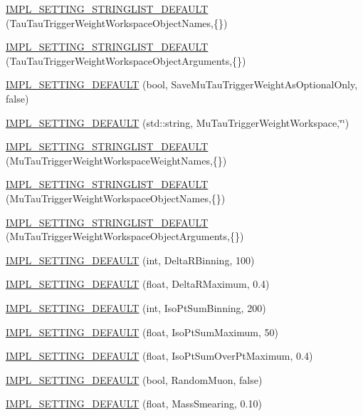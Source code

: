 \begin{DoxyCompactItemize}
\item 
\hyperlink{classHttSettings_a804fffc1952f3be2d23de35fca145662}{IMPL\_\-SETTING\_\-STRINGLIST\_\-DEFAULT} (TauTauTriggerWeightWorkspaceObjectNames,\{\})
\item 
\hyperlink{classHttSettings_a321760ee7322f44ea17c8cfc238125ff}{IMPL\_\-SETTING\_\-STRINGLIST\_\-DEFAULT} (TauTauTriggerWeightWorkspaceObjectArguments,\{\})
\item 
\hyperlink{classHttSettings_a2c395317a2b6371baae4e5b69215e80f}{IMPL\_\-SETTING\_\-DEFAULT} (bool, SaveMuTauTriggerWeightAsOptionalOnly, false)
\item 
\hyperlink{classHttSettings_ad5430ca5352c70d79ccce3b996973fb3}{IMPL\_\-SETTING\_\-DEFAULT} (std::string, MuTauTriggerWeightWorkspace,\char`\"{}\char`\"{})
\item 
\hyperlink{classHttSettings_a9256889e237953b72db38e53aaf3396d}{IMPL\_\-SETTING\_\-STRINGLIST\_\-DEFAULT} (MuTauTriggerWeightWorkspaceWeightNames,\{\})
\item 
\hyperlink{classHttSettings_a387e195dada120611ad08764bf90f172}{IMPL\_\-SETTING\_\-STRINGLIST\_\-DEFAULT} (MuTauTriggerWeightWorkspaceObjectNames,\{\})
\item 
\hyperlink{classHttSettings_abab0cd9af3ee87219628f8803c6e1b89}{IMPL\_\-SETTING\_\-STRINGLIST\_\-DEFAULT} (MuTauTriggerWeightWorkspaceObjectArguments,\{\})
\item 
\hyperlink{classHttSettings_a3dcf03b7bfe0a248a70f1528ada185cb}{IMPL\_\-SETTING\_\-DEFAULT} (int, DeltaRBinning, 100)
\item 
\hyperlink{classHttSettings_a02117824c52f6935030c7c52224d0e9d}{IMPL\_\-SETTING\_\-DEFAULT} (float, DeltaRMaximum, 0.4)
\item 
\hyperlink{classHttSettings_a985e2cd59bd900213f04ee61aa532d85}{IMPL\_\-SETTING\_\-DEFAULT} (int, IsoPtSumBinning, 200)
\item 
\hyperlink{classHttSettings_ae90250f13cf5baa41e67dfb9847d85c4}{IMPL\_\-SETTING\_\-DEFAULT} (float, IsoPtSumMaximum, 50)
\item 
\hyperlink{classHttSettings_a0862d6ec9c0f52fd03a4886b4fee068e}{IMPL\_\-SETTING\_\-DEFAULT} (float, IsoPtSumOverPtMaximum, 0.4)
\item 
\hyperlink{classHttSettings_a82e40b06ba0457e907594caae1c6673e}{IMPL\_\-SETTING\_\-DEFAULT} (bool, RandomMuon, false)
\item 
\hyperlink{classHttSettings_a247aca9246c0e51385df39069a06961e}{IMPL\_\-SETTING\_\-DEFAULT} (float, MassSmearing, 0.10)
\item 

\end{DoxyCompactItemize}
